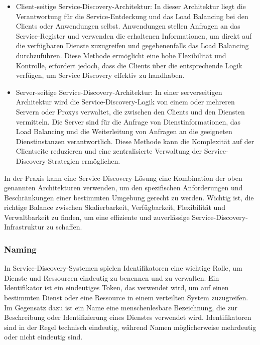 \begin{itemize}
\item Client-seitige Service-Discovery-Architektur: In dieser Architektur liegt die Verantwortung für die Service-Entdeckung und das Load Balancing bei den Clients oder Anwendungen selbst. Anwendungen stellen Anfragen an das Service-Register und verwenden die erhaltenen Informationen, um direkt auf die verfügbaren Dienste zuzugreifen und gegebenenfalls das Load Balancing durchzuführen. Diese Methode ermöglicht eine hohe Flexibilität und Kontrolle, erfordert jedoch, dass die Clients über die entsprechende Logik verfügen, um Service Discovery effektiv zu handhaben.

\item Server-seitige Service-Discovery-Architektur: In einer serverseitigen Architektur wird die Service-Discovery-Logik von einem oder mehreren Servern oder Proxys verwaltet, die zwischen den Clients und den Diensten vermitteln. Die Server sind für die Anfrage von Dienstinformationen, das Load Balancing und die Weiterleitung von Anfragen an die geeigneten Dienstinstanzen verantwortlich. Diese Methode kann die Komplexität auf der Clientseite reduzieren und eine zentralisierte Verwaltung der Service-Discovery-Strategien ermöglichen.
\end{itemize}

In der Praxis kann eine Service-Discovery-Lösung eine Kombination der oben genannten Architekturen verwenden, um den spezifischen Anforderungen und Beschränkungen einer bestimmten Umgebung gerecht zu werden. Wichtig ist, die richtige Balance zwischen Skalierbarkeit, Verfügbarkeit, Flexibilität und Verwaltbarkeit zu finden, um eine effiziente und zuverlässige Service-Discovery-Infrastruktur zu schaffen.

\subsubsection{Naming}

In Service-Discovery-Systemen spielen Identifikatoren eine wichtige Rolle, um Dienste und Ressourcen eindeutig zu benennen und zu verwalten. Ein Identifikator ist ein eindeutiges Token, das verwendet wird, um auf einen bestimmten Dienst oder eine Ressource in einem verteilten System zuzugreifen. Im Gegensatz dazu ist ein Name eine menschenlesbare Bezeichnung, die zur Beschreibung oder Identifizierung eines Dienstes verwendet wird. Identifikatoren sind in der Regel technisch eindeutig, während Namen möglicherweise mehrdeutig oder nicht eindeutig sind.

